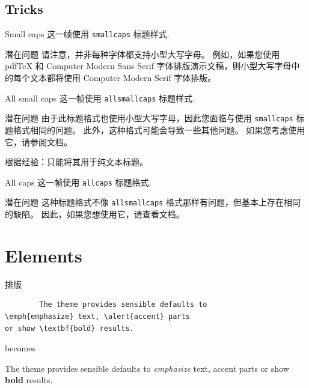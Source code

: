 \documentclass[10pt,UTF8]{ctexbeamer}
\begin{document}
\subsection{Tricks}

{
\begin{frame}{Small caps}
	这一帧使用 \texttt{smallcaps} 标题样式.

	\begin{alertblock}{潜在问题}
		请注意，并非每种字体都支持小型大写字母。 例如，如果您使用 pdfTeX 和 Computer Modern Sans Serif 字体排版演示文稿，则小型大写字母中的每个文本都将使用 Computer Modern Serif 字体排版。
	\end{alertblock}
\end{frame}
}

{
\begin{frame}{All small caps}
	这一帧使用 \texttt{allsmallcaps} 标题样式.

	\begin{alertblock}{潜在问题}
		由于此标题格式也使用小型大写字母，因此您面临与使用 \texttt{smallcaps} 标题格式相同的问题。 此外，这种格式可能会导致一些其他问题。 如果您考虑使用它，请参阅文档。

		根据经验：只能将其用于纯文本标题。
	\end{alertblock}
\end{frame}
}

{
\begin{frame}{All caps}
	这一帧使用 \texttt{allcaps} 标题格式.

	\begin{alertblock}{潜在问题}
		这种标题格式不像 \texttt{allsmallcaps} 格式那样有问题，但基本上存在相同的缺陷。 因此，如果您想使用它，请查看文档。
	\end{alertblock}
\end{frame}
}

\section{Elements}

\begin{frame}[fragile]{排版}
      \begin{verbatim}
      	The theme provides sensible defaults to
\emph{emphasize} text, \alert{accent} parts
or show \textbf{bold} results.
\end{verbatim}

  \begin{center}
  	becomes
  \end{center}

  The theme provides sensible defaults to \emph{emphasize} text,
  \alert{accent} parts or show \textbf{bold} results.
\end{frame}
\end{document}
